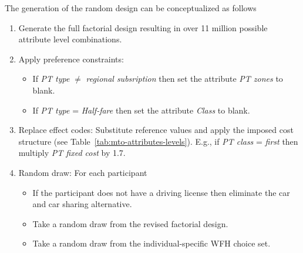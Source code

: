 The generation of the random design can be conceptualized as follows
%
\begin{enumerate}
\item Generate the full factorial design resulting in over 11 million possible attribute level combinations.
\item Apply preference constraints:
\begin{itemize}
\item If \emph{PT type} $\neq$ \emph{regional subsription} then set the attribute \emph{PT zones} to blank.
\item If \emph{PT type} = \emph{Half-fare} then set the attribute \emph{Class} to blank.
\end{itemize}
\item Replace effect codes: Substitute reference values and apply the imposed cost structure (see Table~\ref{tab:mto-attributes-levels}). E.g., if \emph{PT class} = \emph{first} then multiply \emph{PT fixed cost} by 1.7.
\item Random draw: For each participant
\begin{itemize}
\item If the participant does not have a driving license then eliminate the car and car sharing alternative.
\item Take a random draw from the revised factorial design.
\item Take a random draw from the individual-specific WFH choice set.
\end{itemize}
\end{enumerate}
